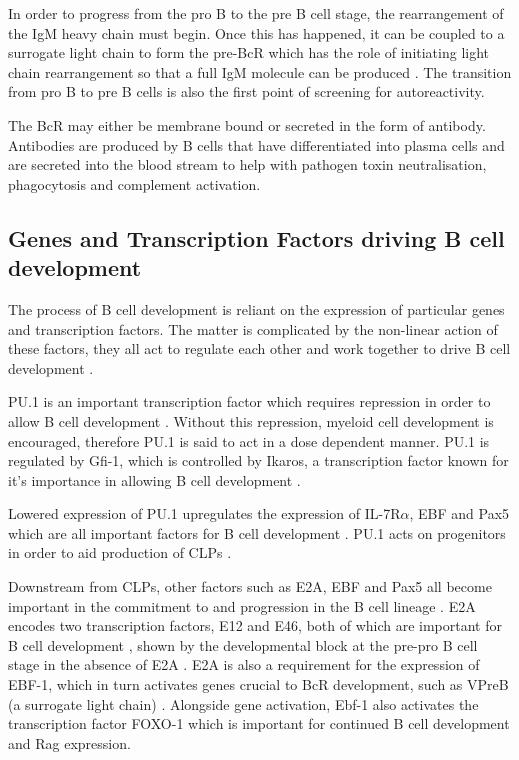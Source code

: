 In order to progress from the pro B to the pre B cell stage, the rearrangement of the IgM heavy chain must begin.
Once this has happened, it can be coupled to a surrogate light chain to form the pre-BcR which has the role of initiating light chain rearrangement so that a full IgM molecule can be produced \citep{Burrows2002}.
The transition from pro B to pre B cells is also the first point of screening for autoreactivity\citep{Pieper2013}.

The BcR may either be membrane bound or secreted in the form of antibody.
Antibodies are produced by B cells that have differentiated into plasma cells and are secreted into the blood stream to help with pathogen toxin neutralisation, phagocytosis and complement activation\citep{Janeway2008}.


\subsection{Genes and Transcription Factors driving B cell development}
\label{subsec:Bcellgenes}

The process of B cell development is reliant on the expression of particular genes and transcription factors.
The matter is complicated by the non-linear action of these factors, they all act to regulate each other and work together to drive B cell development \citep{Mandel2010}.

PU.1 is an important transcription factor which requires repression in order to allow B cell development \citep{Dekoter2000}. 
Without this repression, myeloid cell development is encouraged, therefore PU.1 is said to act in a dose dependent manner.
PU.1 is regulated by Gfi-1, which is controlled by Ikaros, a transcription factor known for it's importance in allowing B cell development \citep{Yoshida2006, Busslinger2004}. 

Lowered expression of PU.1 upregulates the expression of IL-7R$\alpha$, EBF and Pax5 which are all important factors for B cell development \citep{Hagman2006}.
PU.1 acts on progenitors in order to aid production of CLPs \citep{Hagman2006}.

Downstream from CLPs, other factors such as E2A, EBF and Pax5 all become important in the commitment to and progression in the B cell lineage \citep{Mansson2008}.
E2A encodes two transcription factors, E12 and E46, both of which are important for B cell development \citep{Bain1997}, shown by the developmental block at the pre-pro B cell stage in the absence of E2A \citep{Bain1994}.
E2A is also a requirement for the expression of EBF-1, which in turn activates genes crucial to BcR development, such as VPreB (a surrogate light chain) \citep{Welinder2011}.
Alongside gene activation, Ebf-1 also activates the transcription factor FOXO-1 which is important for continued B cell development and Rag expression\citep{Amin2008}.

